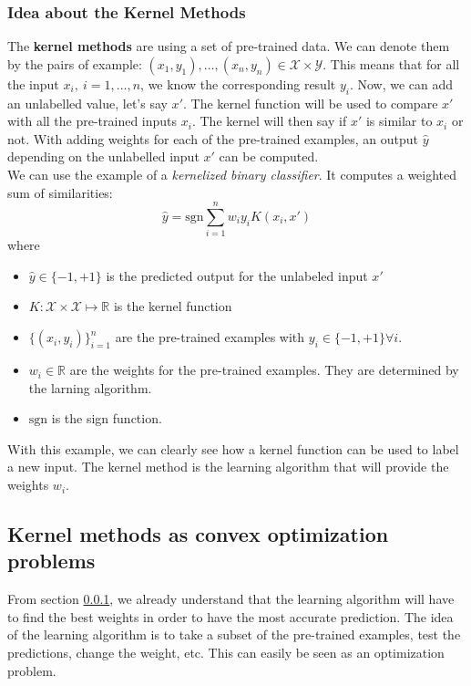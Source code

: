 \documentclass[a4paper, 11pt]{article}
\begin{document}
\subsubsection{Idea about the Kernel Methods}
\label{meth}
The {\bf kernel methods} are using a set of pre-trained data. We can denote them by the pairs of example: $(x_1, y_1), \ldots, (x_n,y_n) \in \mathcal{X} \times \mathcal{Y}$. This means that for all the input $x_i, ~ i=1,\ldots,n$, we know the corresponding result $y_i$. Now, we can add an unlabelled value, let's say $x'$. The kernel function will be used to compare $x'$ with all the pre-trained inputs $x_i$. The kernel will then say if $x'$ is similar to $x_i$ or not. With adding weights for each of the pre-trained examples, an output $\hat{y}$ depending on the unlabelled input $x'$ can be computed. 
\\ 
We can use the example of a {\it kernelized binary classifier}. It computes a weighted sum of similarities:
\begin{equation}
\hat{y} = \text{sgn}\sum_{i=1}^{n }w_i y_i K(x_i,x')
\end{equation}
where
\begin{itemize}
\item $\hat{y}\in\{-1,+1\}$ is the predicted output for the unlabeled input $x'$
\item $K: \mathcal{X}\times\mathcal{X} \mapsto \mathbb{R}$ is the kernel function
\item $\{(x_i, y_i)\}_{i=1}^{n}$ are the pre-trained examples with $y_i\in\{-1,+1\}\forall i$.
\item $w_i\in \mathbb{R}$ are the weights for the pre-trained examples. They are determined by the larning algorithm.
\item $\text{sgn}$ is the sign function.
\end{itemize}
With this example, we can clearly see how a kernel function can be used to label a new input. The kernel method is the learning algorithm that will provide the weights $w_i$.

\subsection{Kernel methods as convex optimization problems}

From section \ref{meth}, we already understand that the learning algorithm will have to find the best weights in order to have the most accurate prediction. The idea of the learning algorithm is to take a subset of the pre-trained examples, test the predictions, change the weight, etc. This can easily be seen as an optimization problem.  
\end{document}
